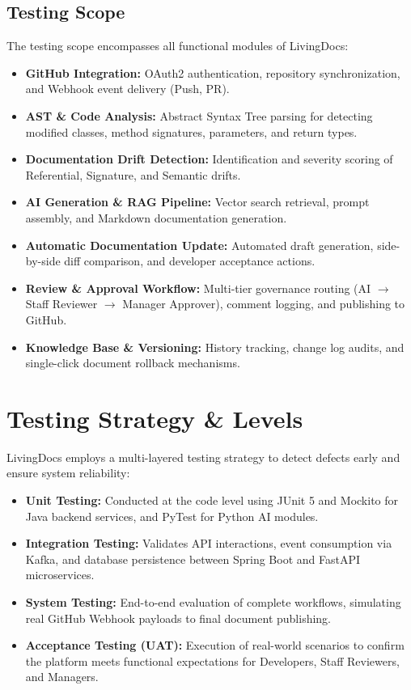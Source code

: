 \subsection{Testing Scope}
The testing scope encompasses all functional modules of LivingDocs:
\begin{itemize}
    \item \textbf{GitHub Integration:} OAuth2 authentication, repository synchronization, and Webhook event delivery (Push, PR).
    \item \textbf{AST \& Code Analysis:} Abstract Syntax Tree parsing for detecting modified classes, method signatures, parameters, and return types.
    \item \textbf{Documentation Drift Detection:} Identification and severity scoring of Referential, Signature, and Semantic drifts.
    \item \textbf{AI Generation \& RAG Pipeline:} Vector search retrieval, prompt assembly, and Markdown documentation generation.
    \item \textbf{Automatic Documentation Update:} Automated draft generation, side-by-side diff comparison, and developer acceptance actions.
    \item \textbf{Review \& Approval Workflow:} Multi-tier governance routing (AI $\rightarrow$ Staff Reviewer $\rightarrow$ Manager Approver), comment logging, and publishing to GitHub.
    \item \textbf{Knowledge Base \& Versioning:} History tracking, change log audits, and single-click document rollback mechanisms.
\end{itemize}

\section{Testing Strategy \& Levels}

LivingDocs employs a multi-layered testing strategy to detect defects early and ensure system reliability:

\begin{itemize}
    \item \textbf{Unit Testing:} Conducted at the code level using JUnit 5 and Mockito for Java backend services, and PyTest for Python AI modules.
    \item \textbf{Integration Testing:} Validates API interactions, event consumption via Kafka, and database persistence between Spring Boot and FastAPI microservices.
    \item \textbf{System Testing:} End-to-end evaluation of complete workflows, simulating real GitHub Webhook payloads to final document publishing.
    \item \textbf{Acceptance Testing (UAT):} Execution of real-world scenarios to confirm the platform meets functional expectations for Developers, Staff Reviewers, and Managers.
\end{itemize}

